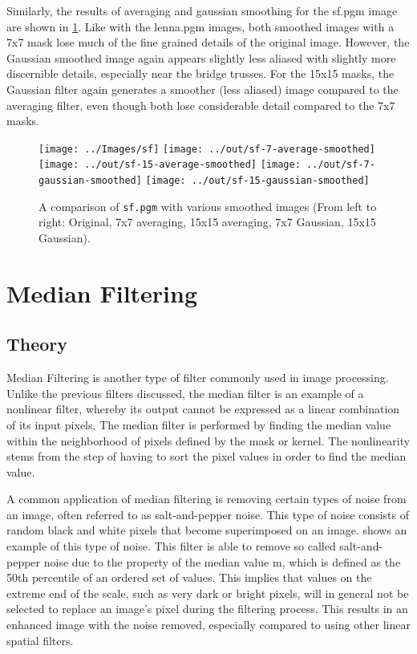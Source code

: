 \documentclass[headings=optiontoheadandtoc,listof=totoc,parskip=full]{scrartcl}
\begin{document}
Similarly, the results of averaging and gaussian smoothing for the sf.pgm image are shown in \cref{fig:smoothing-result-2}. Like with the lenna.pgm images, both smoothed images with a 7x7 mask lose much of the fine grained details of the original image. However, the Gaussian smoothed image again appears slightly less aliased with slightly more discernible details, especially near the bridge trusses. For the 15x15 masks, the Gaussian filter again generates a smoother (less aliased) image compared to the averaging filter, even though both lose considerable detail compared to the 7x7 masks.

\begin{figure}[H]
	\centering
	\texttt{[image: ../Images/sf]}
	\texttt{[image: ../out/sf-7-average-smoothed]}
	\texttt{[image: ../out/sf-15-average-smoothed]}
	\texttt{[image: ../out/sf-7-gaussian-smoothed]}
	\texttt{[image: ../out/sf-15-gaussian-smoothed]}
	\caption{A comparison of \texttt{sf.pgm} with various smoothed images (From left to right: Original, 7x7 averaging, 15x15 averaging, 7x7 Gaussian, 15x15 Gaussian).}
	\label{fig:smoothing-result-2}
\end{figure}

\section{Median Filtering}
\label{sec:median}


\subsection{Theory}
\label{sec:median-theory}

Median Filtering is another type of filter commonly used in image processing. Unlike the previous filters discussed, the median filter is an example of a nonlinear filter, whereby its output cannot be expressed as a linear combination of its input pixels. The median filter is performed by finding the median value within the neighborhood of pixels defined by the mask or kernel. The nonlinearity stems from the step of having to sort the pixel values in order to find the median value. 

A common application of median filtering is removing certain types of noise from an image, often referred to as salt-and-pepper noise. This type of noise consists of random black and white pixels that become superimposed on an image.  shows an example of this type of noise. This filter is able to remove so called salt-and-pepper noise due to the property of the median value m, which is defined as the 50th percentile of an ordered set of values. This implies that values on the extreme end of the scale, such as very dark or bright pixels, will in general not be selected to replace an image’s pixel during the filtering process. This results in an enhanced image with the noise removed, especially compared to using other linear spatial filters.
\end{document}
